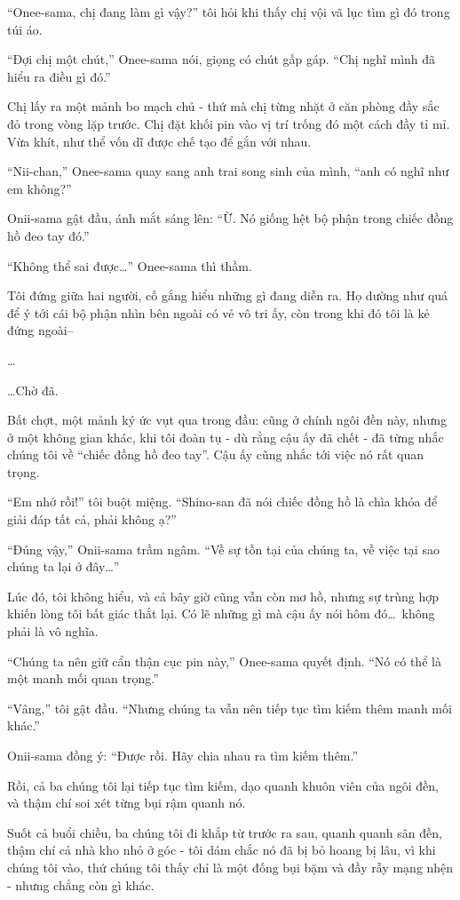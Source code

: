 \documentclass[../main.tex]{subfiles}
\begin{document}
``Onee-sama, chị đang làm gì vậy?'' tôi hỏi khi thấy chị vội vã lục tìm gì đó trong túi áo.

``Đợi chị một chút,'' Onee-sama nói, giọng có chút gấp gáp. ``Chị nghĩ mình đã hiểu ra điều gì đó.''

Chị lấy ra một mảnh bo mạch chủ - thứ mà chị từng nhặt ở căn phòng đầy sắc đỏ trong vòng lặp trước. Chị đặt khối pin vào vị trí trống đó một cách đầy tỉ mỉ. Vừa khít, như thể vốn dĩ được chế tạo để gắn với nhau.

``Nii-chan,'' Onee-sama quay sang anh trai song sinh của mình, ``anh có nghĩ như em không?''

Onii-sama gật đầu, ánh mắt sáng lên: ``Ừ. Nó giống hệt bộ phận trong chiếc đồng hồ đeo tay đó.''

``Không thể sai được\dots'' Onee-sama thì thầm.

Tôi đứng giữa hai người, cố gắng hiểu những gì đang diễn ra. Họ dường như quá để ý tới cái bộ phận nhìn bên ngoài có vẻ vô tri ấy, còn trong khi đó tôi là kẻ đứng ngoài--

\dots

\dots Chờ đã.

Bất chợt, một mảnh ký ức vụt qua trong đầu: cũng ở chính ngôi đền này, nhưng ở một không gian khác, khi tôi đoàn tụ - dù rằng cậu ấy đã chết - đã từng nhắc chúng tôi về ``chiếc đồng hồ đeo tay''. Cậu ấy cũng nhắc tới việc nó rất quan trọng.

``Em nhớ rồi!'' tôi buột miệng. ``Shino-san đã nói chiếc đồng hồ là chìa khóa để giải đáp tất cả, phải không ạ?''

``Đúng vậy,'' Onii-sama trầm ngâm. ``Về sự tồn tại của chúng ta, về việc tại sao chúng ta lại ở đây\dots''

Lúc đó, tôi không hiểu, và cả bây giờ cũng vẫn còn mơ hồ, nhưng sự trùng hợp khiến lòng tôi bất giác thắt lại. Có lẽ những gì mà cậu ấy nói hôm đó\dots\ không phải là vô nghĩa.

``Chúng ta nên giữ cẩn thận cục pin này,'' Onee-sama quyết định. ``Nó có thể là một manh mối quan trọng.''

``Vâng,'' tôi gật đầu. ``Nhưng chúng ta vẫn nên tiếp tục tìm kiếm thêm manh mối khác.''

Onii-sama đồng ý: ``Được rồi. Hãy chia nhau ra tìm kiếm thêm.''

Rồi, cả ba chúng tôi lại tiếp tục tìm kiếm, dạo quanh khuôn viên của ngôi đền, và thậm chí soi xét từng bụi rậm quanh nó.

Suốt cả buổi chiều, ba chúng tôi đi khắp từ trước ra sau, quanh quanh sân đền, thậm chí cả nhà kho nhỏ ở góc - tôi dám chắc nó đã bị bỏ hoang bị lâu, vì khi chúng tôi vào, thứ chúng tôi thấy chỉ là một đống bụi bặm và đầy rẫy mạng nhện - nhưng chẳng còn gì khác.
\end{document}
